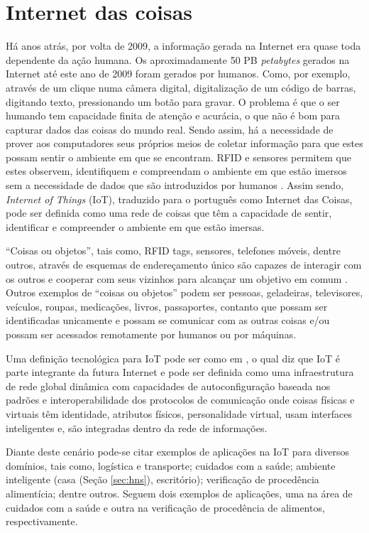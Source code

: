 ﻿\section{Internet das coisas}
\label{sec:iot}
Há anos atrás, por volta de 2009, a informação gerada na Internet era quase toda dependente da ação humana. Os aproximadamente 50 PB \textit{petabytes} gerados na Internet até este ano de 2009 foram gerados por humanos. Como, por exemplo, através de um clique numa câmera digital, digitalização de um código de barras, digitando texto, pressionando um botão para gravar. O problema é que o ser humando tem capacidade finita de atenção e acurácia, o que não é bom para capturar dados das coisas do mundo real. Sendo assim, há a necessidade de prover aos computadores seus próprios meios de coletar informação para que estes possam sentir o ambiente em que se encontram. RFID e sensores permitem que estes observem, identifiquem e compreendam o ambiente em que estão imersos sem a necessidade de dados que são introduzidos por humanos \cite{Ashton:2009}. Assim sendo, \textit{Internet of Things} (IoT), traduzido para o português como Internet das Coisas, pode ser definida como uma rede de coisas que têm a capacidade de sentir, identificar e compreender o ambiente em que estão imersas.

``Coisas ou objetos'', tais como, RFID tags, sensores, telefones móveis, dentre outros, através de esquemas de endereçamento único são capazes de interagir com os outros e cooperar com seus vizinhos para alcançar um objetivo em comum \cite{Atzori:2010}. Outros exemplos de ``coisas ou objetos'' podem ser pessoas, geladeiras, televisores, veículos, roupas, medicações, livros, passaportes, contanto que possam ser identificadas unicamente e possam se comunicar com as outras coisas e/ou possam ser acessados remotamente por humanos ou por máquinas.

Uma definição tecnológica para IoT pode ser como em \cite{Sundmaeker:2010}, o qual diz que IoT é parte integrante da futura Internet e pode ser definida como uma infraestrutura de rede global dinâmica com capacidades de autoconfiguração baseada nos padrões e interoperabilidade dos protocolos de comunicação onde coisas físicas e virtuais têm identidade, atributos físicos, personalidade virtual, usam interfaces inteligentes e, são integradas dentro da rede de informações.

Diante deste cenário pode-se citar exemplos de aplicações na IoT para diversos domínios, tais como, logística e transporte; cuidados com a saúde; ambiente inteligente (casa (Seção \ref{sec:hns}), escritório); \cite{Atzori:2010} verificação de procedência alimentícia; dentre outros. Seguem dois exemplos de aplicações, uma na área de cuidados com a saúde e outra na verificação de procedência de alimentos, respectivamente.

